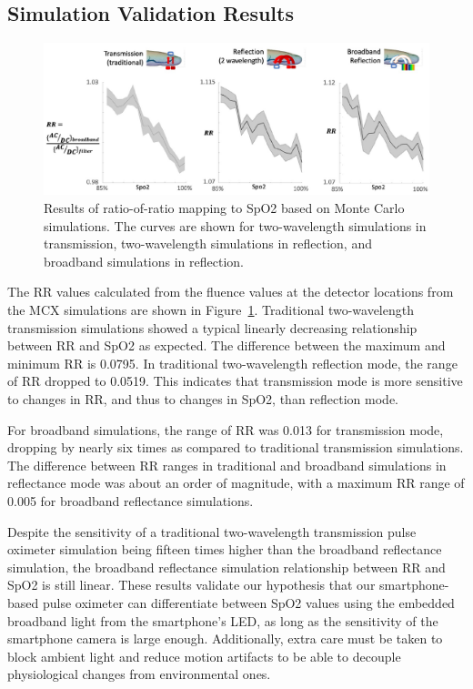 \subsection{Simulation Validation Results}
\begin{figure}
    \begin{center}
    \includegraphics[width=\textwidth]{fig/moxi/D3RR.pdf}
    \end{center}
    \caption{Results of ratio-of-ratio mapping to SpO2 based on Monte Carlo simulations. The curves are shown for two-wavelength simulations in transmission, two-wavelength simulations in reflection, and broadband simulations in reflection.} 
    \label{fig:D3RR}
\end{figure}
The RR values calculated from the fluence values at the detector locations from the MCX simulations are shown in Figure~\ref{fig:D3RR}. Traditional two-wavelength transmission simulations showed a typical linearly decreasing relationship between RR and SpO2 as expected. The difference between the maximum and minimum RR is 0.0795. In traditional two-wavelength reflection mode, the range of RR dropped to 0.0519. This indicates that transmission mode is more sensitive to changes in RR, and thus to changes in SpO2, than reflection mode. 

For broadband simulations, the range of RR was 0.013 for transmission mode, dropping by nearly six times as compared to traditional transmission simulations. The difference between RR ranges in traditional and broadband simulations in reflectance mode was about an order of magnitude, with a maximum RR range of 0.005 for broadband reflectance simulations. 

Despite the sensitivity of a traditional two-wavelength transmission pulse oximeter simulation being fifteen times higher than the broadband reflectance simulation, the broadband reflectance simulation relationship between RR and SpO2 is still linear. These results validate our hypothesis that our smartphone-based pulse oximeter can differentiate between SpO2 values using the embedded broadband light from the smartphone's LED, as long as the sensitivity of the smartphone camera is large enough. Additionally, extra care must be taken to block ambient light and reduce motion artifacts to be able to decouple physiological changes from environmental ones. 

